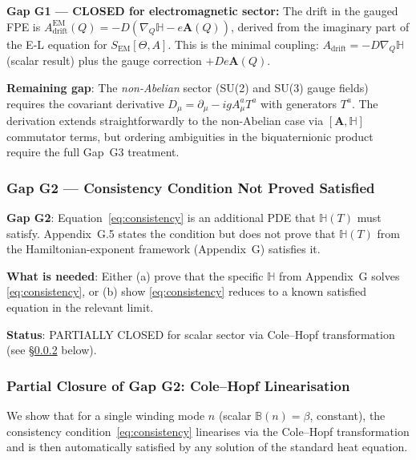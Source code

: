 \documentclass[12pt]{article}
\theoremstyle{definition}
\theoremstyle{remark}
\begin{document}
\begin{resultbox}
\textbf{Gap G1 — CLOSED for electromagnetic sector:}
The drift in the gauged FPE is
$A_{\mathrm{drift}}^{\mathrm{EM}}(Q) = -D(\nabla_Q\mathbb{H} - e\mathbf{A}(Q))$,
derived from the imaginary part of the E-L equation for
$S_{\mathrm{EM}}[\Theta, A]$.  This is the minimal coupling:
$A_{\mathrm{drift}} = -D\nabla_Q\mathbb{H}$ (scalar result) plus the gauge
correction $+De\mathbf{A}(Q)$.

\medskip
\textbf{Remaining gap}: The \emph{non-Abelian} sector (SU(2) and SU(3) gauge
fields) requires the covariant derivative $D_\mu = \partial_\mu - ig A_\mu^a T^a$
with generators $T^a$.  The derivation extends straightforwardly to the
non-Abelian case via $[\mathbf{A}, \mathbb{H}]$ commutator terms, but ordering
ambiguities in the biquaternionic product require the full Gap~G3 treatment.
\end{resultbox}

\subsubsection{Gap G2 — Consistency Condition Not Proved Satisfied}

\begin{gapbox}
\textbf{Gap G2}: Equation~\eqref{eq:consistency} is an additional PDE that $\mathbb{H}(T)$
must satisfy.  Appendix~G.5 states the condition but does not prove that $\mathbb{H}(T)$
from the Hamiltonian-exponent framework (Appendix~G) satisfies it.

\textbf{What is needed}: Either
(a) prove that the specific $\mathbb{H}$ from Appendix~G solves \eqref{eq:consistency}, or
(b) show \eqref{eq:consistency} reduces to a known satisfied equation in the
    relevant limit.

\textbf{Status}: PARTIALLY CLOSED for scalar sector via Cole--Hopf transformation
(see §\ref{subsubsec:gap_g2_cole_hopf} below).
\end{gapbox}

\subsubsection{Partial Closure of Gap G2: Cole--Hopf Linearisation}
\label{subsubsec:gap_g2_cole_hopf}

We show that for a single winding mode $n$ (scalar $\mathbb{B}(n) = \beta$,
constant), the consistency condition~\eqref{eq:consistency} linearises via the
Cole--Hopf transformation and is then automatically satisfied by any solution
of the standard heat equation.
\end{document}
